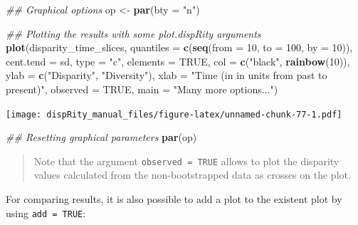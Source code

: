 \documentclass[]{book}
\newenvironment{Shaded}{\begin{snugshade}}{\end{snugshade}}
\newcommand{\CommentTok}[1]{\textcolor[rgb]{0.56,0.35,0.01}{\textit{#1}}}
\newcommand{\DataTypeTok}[1]{\textcolor[rgb]{0.13,0.29,0.53}{#1}}
\newcommand{\DecValTok}[1]{\textcolor[rgb]{0.00,0.00,0.81}{#1}}
\newcommand{\KeywordTok}[1]{\textcolor[rgb]{0.13,0.29,0.53}{\textbf{#1}}}
\newcommand{\NormalTok}[1]{#1}
\newcommand{\OtherTok}[1]{\textcolor[rgb]{0.56,0.35,0.01}{#1}}
\newcommand{\StringTok}[1]{\textcolor[rgb]{0.31,0.60,0.02}{#1}}
\begin{document}
\begin{Shaded}
\begin{Highlighting}[]
\CommentTok{## Graphical options}
\NormalTok{op <-}\StringTok{ }\KeywordTok{par}\NormalTok{(}\DataTypeTok{bty =} \StringTok{"n"}\NormalTok{)}

\CommentTok{## Plotting the results with some plot.dispRity arguments}
\KeywordTok{plot}\NormalTok{(disparity_time_slices,}
    \DataTypeTok{quantiles =} \KeywordTok{c}\NormalTok{(}\KeywordTok{seq}\NormalTok{(}\DataTypeTok{from =} \DecValTok{10}\NormalTok{, }\DataTypeTok{to =} \DecValTok{100}\NormalTok{, }\DataTypeTok{by =} \DecValTok{10}\NormalTok{)),}
    \DataTypeTok{cent.tend =}\NormalTok{ sd, }\DataTypeTok{type =} \StringTok{"c"}\NormalTok{, }\DataTypeTok{elements =} \OtherTok{TRUE}\NormalTok{,}
    \DataTypeTok{col =} \KeywordTok{c}\NormalTok{(}\StringTok{"black"}\NormalTok{, }\KeywordTok{rainbow}\NormalTok{(}\DecValTok{10}\NormalTok{)),}
    \DataTypeTok{ylab =} \KeywordTok{c}\NormalTok{(}\StringTok{"Disparity"}\NormalTok{, }\StringTok{"Diversity"}\NormalTok{),}
    \DataTypeTok{xlab =} \StringTok{"Time (in in units from past to present)"}\NormalTok{,}
    \DataTypeTok{observed =} \OtherTok{TRUE}\NormalTok{,}
    \DataTypeTok{main =} \StringTok{"Many more options..."}\NormalTok{)}
\end{Highlighting}
\end{Shaded}

\texttt{[image: dispRity\_manual\_files/figure-latex/unnamed-chunk-77-1.pdf]}

\begin{Shaded}
\begin{Highlighting}[]
\CommentTok{## Resetting graphical parameters}
\KeywordTok{par}\NormalTok{(op)}
\end{Highlighting}
\end{Shaded}

\begin{quote}
Note that the argument \texttt{observed\ =\ TRUE} allows to plot the disparity values calculated from the non-bootstrapped data as crosses on the plot.
\end{quote}

For comparing results, it is also possible to add a plot to the existent plot by using \texttt{add\ =\ TRUE}:
\end{document}
